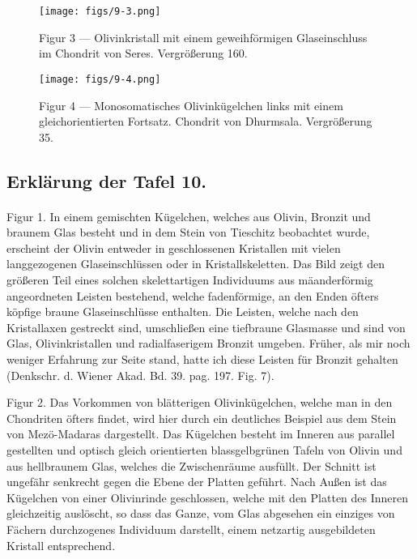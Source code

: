 \documentclass[a4paper, 11pt, oneside, polutonikogreek, german]{article}
\begin{document}
\vspace*{\fill}
\begin{figure}[H]
\centering
\texttt{[image: figs/9-3.png]}
\caption{\small Figur 3 --- Olivinkristall mit einem geweihförmigen Glaseinschluss im Chondrit von Seres. Vergrößerung 160.}
\end{figure}
\vspace*{\fill}
\clearpage

\vspace*{\fill}
\begin{figure}[H]
\centering
\texttt{[image: figs/9-4.png]}
\caption{\small Figur 4 --- Monosomatisches Olivinkügelchen links mit einem gleichorientierten Fortsatz. Chondrit von Dhurmsala. Vergrößerung 35.}
\end{figure}
\vspace*{\fill}
\clearpage

\subsection{Erklärung der Tafel 10.}
\paragraph{}
Figur 1. In einem gemischten Kügelchen, welches aus Olivin, Bronzit und braunem Glas besteht und in dem Stein von Tieschitz beobachtet wurde, erscheint der Olivin entweder in geschlossenen Kristallen mit vielen langgezogenen Glaseinschlüssen oder in Kristallskeletten. Das Bild zeigt den größeren Teil eines solchen skelettartigen Individuums aus mäanderförmig angeordneten Leisten bestehend, welche fadenförmige, an den Enden öfters köpfige braune Glaseinschlüsse enthalten. Die Leisten, welche nach den Kristallaxen gestreckt sind, umschließen eine tiefbraune Glasmasse und sind von Glas, Olivinkristallen und radialfaserigem Bronzit umgeben. Früher, als mir noch weniger Erfahrung zur Seite stand, hatte ich diese Leisten für Bronzit gehalten (Denkschr. d. Wiener Akad. Bd. 39. pag. 197. Fig. 7).

Figur 2. Das Vorkommen von blätterigen Olivinkügelchen, welche man in den Chondriten öfters findet, wird hier durch ein deutliches Beispiel aus dem Stein von Mezö-Madaras dargestellt. Das Kügelchen besteht im Inneren aus parallel gestellten und optisch gleich orientierten blassgelbgrünen Tafeln von Olivin und aus hellbraunem Glas, welches die Zwischenräume ausfüllt. Der Schnitt ist ungefähr senkrecht gegen die Ebene der Platten geführt. Nach Außen ist das Kügelchen von einer Olivinrinde geschlossen, welche mit den Platten des Inneren gleichzeitig auslöscht, so dass das Ganze, vom Glas abgesehen ein einziges von Fächern durchzogenes Individuum darstellt, einem netzartig ausgebildeten Kristall entsprechend.
\end{document}

